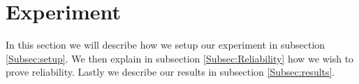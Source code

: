 \section{Experiment}\label{Sec:Experiment}
In this section we will describe how we setup our experiment in subsection \ref{Subsec:setup}. We then explain in subsection \ref{Subsec:Reliability} how we wish to prove reliability. Lastly we describe our results in subsection \ref{Subsec:results}.





